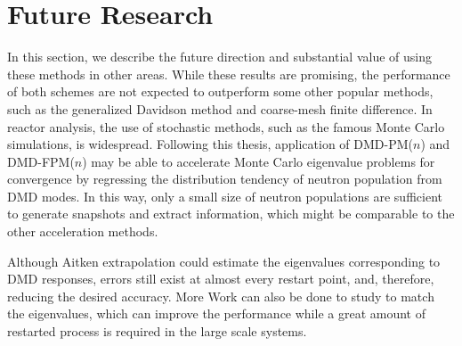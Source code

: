 \section{Future Research}
In this section, we describe the future direction and substantial value of using these methods in other areas.
While these results are promising, the performance of both schemes are not expected to outperform some other popular methods, such as the generalized Davidson method\cite{hamilton2011numerical} and coarse-mesh finite difference\cite{smith_1983}.
In reactor analysis, the use of stochastic methods, such as the famous Monte Carlo simulations, is widespread.
Following this thesis, application of DMD-PM($n$) and DMD-FPM($n$) may be able to accelerate Monte Carlo eigenvalue problems for convergence by regressing the distribution tendency of neutron population from DMD modes.
In this way, only a small size of neutron populations are sufficient to generate snapshots and extract information, which might be comparable to the other acceleration methods.

Although Aitken extrapolation could estimate the eigenvalues corresponding to DMD responses, errors still exist at almost every restart point, and, therefore, reducing the desired accuracy. 
More Work can also be done to study to match the eigenvalues, which can improve the performance while a great amount of restarted process is required in the large scale systems.


